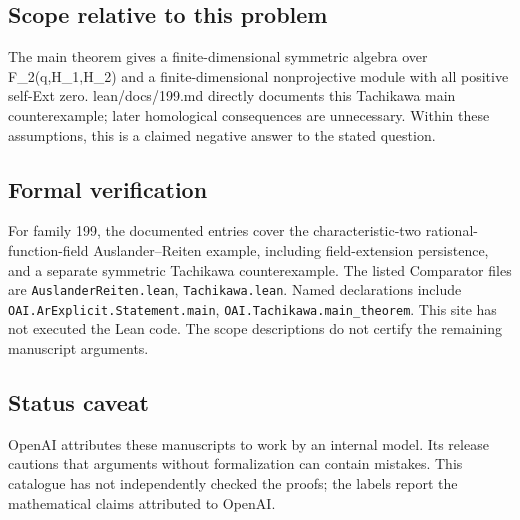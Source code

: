 \documentclass[11pt]{article}
\begin{document}
\subsection{Scope relative to this problem}
The main theorem gives a finite-dimensional symmetric algebra over F\_2(q,H\_1,H\_2) and a finite-dimensional nonprojective module with all positive self-Ext zero. lean/docs/199.md directly documents this Tachikawa main counterexample; later homological consequences are unnecessary. Within these assumptions, this is a claimed negative answer to the stated question.

\subsection{Formal verification}
For family 199, the documented entries cover the characteristic-two rational-function-field Auslander--Reiten example, including field-extension persistence, and a separate symmetric Tachikawa counterexample. The listed Comparator files are \texttt{AuslanderReiten.lean}, \texttt{Tachikawa.lean}. Named declarations include \texttt{OAI.ArExplicit.Statement.main}, \texttt{OAI.Tachikawa.main\_theorem}. This site has not executed the Lean code. The scope descriptions do not certify the remaining manuscript arguments.

\subsection{Status caveat}
OpenAI attributes these manuscripts to work by an internal model. Its release cautions that arguments without formalization can contain mistakes. This catalogue has not independently checked the proofs; the labels report the mathematical claims attributed to OpenAI.
\end{document}
